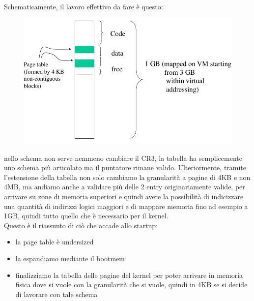 \documentclass[12pt, oneside]{extbook}
\begin{document}
Schematicamente, il lavoro effettivo da fare è questo: 
\begin{figure}[!h]
	\includegraphics[scale=0.4]{immagini/bootmem_work.png}
\end{figure}
nello schema non serve nemmeno cambiare il CR3, la tabella ha semplicemente uno schema più articolato ma il puntatore rimane valido. Ulteriormente, tramite l'estensione della tabella non solo cambiamo la granularità a pagine di 4KB e non 4MB, ma andiamo anche a validare più delle 2 entry originariamente valide, per arrivare su zone di memoria superiori e quindi avere la possibilità di indicizzare una quantità di indirizzi logici maggiori e di mappare memoria fino ad esempio a 1GB, quindi tutto quello che è necessario per il kernel.\\ Questo è il riassunto di ciò che accade allo startup:
\begin{itemize}
\item la page table è undersized
\item la espandiamo mediante il bootmem
\item finalizziamo la tabella delle pagine del kernel per poter arrivare in memoria fisica dove si vuole con la granularità che si vuole, quindi in 4KB se si decide di lavorare con tale schema
\end{itemize}
\end{document}
